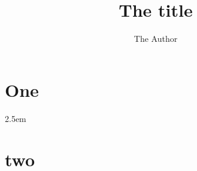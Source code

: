 \documentclass{article}
\title{The title}
\author{The Author}
\date{}
\begin{document}
\maketitle
  \begin{abstract}
  \lipsum[1]
  \end{abstract}

\section{One}

\leftskip2.5em
\rightskip\leftskip

  \lipsum[3]
\let\osection\section

{\leftskip-0pt\section{two}}

  \lipsum[4]
  
\end{document}

